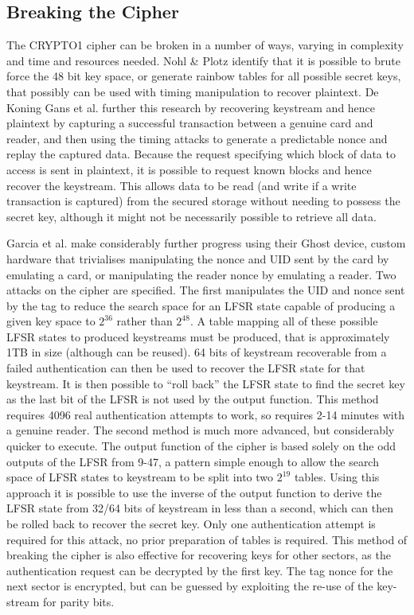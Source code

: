 \documentclass[pdflatex, a4paper,12pt]{article}
\begin{document}
\subsection{Breaking the Cipher}

The CRYPTO1 cipher can be broken in a number of ways, varying in complexity and
time and resources needed. Nohl \& Plotz identify that it is possible to brute
force the 48 bit key space, or generate rainbow tables for all possible secret
keys, that possibly can be used with timing manipulation to recover plaintext.
De Koning Gans et al. further this research by recovering keystream and hence
plaintext by capturing a successful transaction between a genuine card and
reader, and then using the timing attacks to generate a predictable nonce and
replay the captured data\cite{gans_practical_2008}. Because the request
specifying which block of data to
access is sent in plaintext, it is possible to request known blocks and hence
recover the keystream. This allows data to be read (and write if a write
transaction is captured) from the secured storage without needing to possess the
secret key, although it might not be necessarily possible to retrieve all data.

Garcia et al. make considerably further progress using their Ghost device,
custom hardware that trivialises manipulating the nonce and UID sent by the card
by emulating a card, or manipulating the reader nonce by emulating a reader. Two
attacks on the cipher are specified. The first manipulates the UID and nonce
sent by the tag to reduce the search space for an LFSR state capable of
producing a given key space to $2^{36}$ rather than $2^{48}$. A table mapping all of
these possible LFSR states to produced keystreams must be produced, that is
approximately 1TB in size (although can be reused). 64 bits of keystream
recoverable from a failed authentication can then be used to recover the LFSR
state for that keystream. It is then possible to ``roll back'' the LFSR state to
find the secret key as the last bit of the LFSR is not used by the output
function. This method requires 4096 real authentication attempts to work, so
requires 2-14 minutes with a genuine reader. The second method is much more
advanced, but considerably quicker to execute. The output function of the cipher
is based solely on the odd outputs of the LFSR from 9-47, a pattern simple
enough to allow the search space of LFSR states to keystream to be split into
two $2^{19}$ tables. Using this approach it is possible to use the inverse of the output
function to derive the LFSR state from 32/64 bits of keystream in less than a
second, which can then be rolled back to recover the secret key. Only one
authentication attempt is required for this attack, no prior preparation of
tables is required. This method of breaking the cipher is also effective for
recovering keys for other sectors, as the authentication request can be
decrypted by the first key. The tag nonce for the next sector is encrypted, but
can be guessed by exploiting the re-use of the key-stream for parity bits. 
\end{document}
